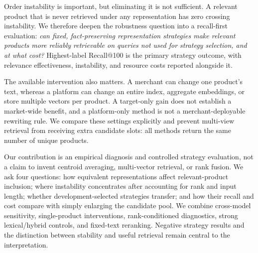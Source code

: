 Order instability is important, but eliminating it is not sufficient. A relevant product that is never retrieved under any representation has zero crossing instability. We therefore deepen the robustness question into a recall-first evaluation: \emph{can fixed, fact-preserving representation strategies make relevant products more reliably retrievable on queries not used for strategy selection, and at what cost?} Highest-label Recall@100 is the primary strategy outcome, with relevance effectiveness, instability, and resource costs reported alongside it.

The available intervention also matters. A merchant can change one product's text, whereas a platform can change an entire index, aggregate embeddings, or store multiple vectors per product. A target-only gain does not establish a market-wide benefit, and a platform-only method is not a merchant-deployable rewriting rule. We compare these settings explicitly and prevent multi-view retrieval from receiving extra candidate slots: all methods return the same number of unique products.

Our contribution is an empirical diagnosis and controlled strategy evaluation, not a claim to invent centroid averaging, multi-vector retrieval, or rank fusion. We ask four questions: how equivalent representations affect relevant-product inclusion; where instability concentrates after accounting for rank and input length; whether development-selected strategies transfer; and how their recall and cost compare with simply enlarging the candidate pool. We combine cross-model sensitivity, single-product interventions, rank-conditioned diagnostics, strong lexical/hybrid controls, and fixed-text reranking. Negative strategy results and the distinction between stability and useful retrieval remain central to the interpretation.
